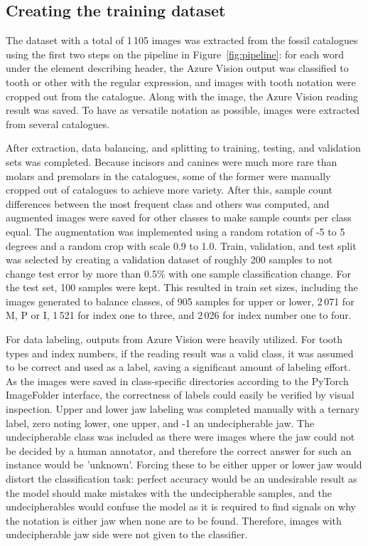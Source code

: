 \documentclass[english,twoside,openright]{UH_DS_MSc}
\begin{document}
\subsection{Creating the training dataset}

The dataset with a total of 1\,105 images was extracted from the fossil 
catalogues using the first two steps on the pipeline in Figure~\ref{fig:pipeline}:
for each word under the element describing header, the Azure Vision output was classified 
to tooth or other with the regular expression, and 
images with tooth notation were cropped out from the catalogue. Along with the image, the 
Azure Vision \cite{azurevision} reading result was saved. To have as versatile notation as possible, images were 
extracted from several catalogues.

After extraction, data balancing, and splitting to training, testing, and validation sets 
was completed.
Because incisors and canines were much more rare 
than molars and premolars in the catalogues, some of the former were manually cropped out 
of catalogues to achieve more variety. After this, sample count differences 
 between the most frequent class and others was computed, and augmented 
images were saved for other classes to make sample counts per class equal. The augmentation 
was implemented using a random rotation of -5 to 5 degrees and a random crop with scale 0.9 to 1.0.
Train, validation, and test split was selected by creating a validation dataset of roughly 200 samples to
 not change test error by more than 0.5\% with one sample classification
change. For the test set, 100 samples were kept. This resulted in 
train set sizes, including the images generated to balance classes, of 905 samples for upper or lower, 
2\,071 for M, P or I, 1\,521 for index one to three, and 2\,026 for index number one to four.

For data labeling, outputs from Azure Vision were heavily utilized. For 
tooth types and index numbers, if the reading result was a valid class, it was assumed to 
be correct and used as a label, saving a significant amount of labeling effort. As the 
images were saved in class-specific directories according to the PyTorch ImageFolder interface,
the correctness of labels could easily be verified by visual inspection. Upper and lower jaw labeling 
was completed manually with a ternary label, zero noting lower, one upper, and -1 an undecipherable jaw.
The undecipherable class was included as there were images where the jaw could not be decided by a human annotator, 
and therefore the correct answer for such an instance would be 'unknown'. Forcing these to be either upper or lower jaw 
would distort the classification task: perfect accuracy would be an undesirable result as the model should 
make mistakes with the undecipherable samples, and the undecipherables would confuse the model as it is required to find signals on why 
the notation is either jaw when none are to be found. Therefore, images with undecipherable jaw side were not given 
to the classifier.
\end{document}
